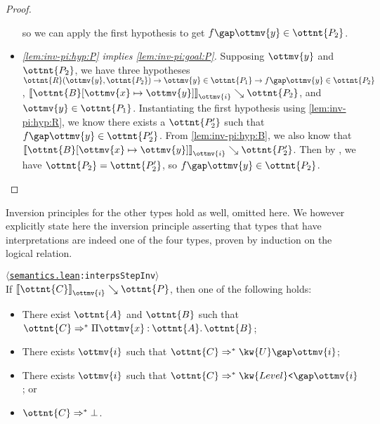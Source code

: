 \documentclass[a4paper,UKenglish,cleveref,autoref,thm-restate]{lipics-v2021}
\newcommand{\repo}{https://github.com/ionathanch/TTBFL}
\newcommand{\thmref}[2]{%
  $\langle$\href{\repo/tree/main/src/#1}{\texttt{#1}}\texttt{:#2}$\rangle$%
}
\begin{document}
\begin{proof}
\begin{itemize}[topsep=0pt]
      so we can apply the first hypothesis to get $  f  \gap  \ottmv{y}   \in  \ottnt{P_{{\mathrm{2}}}} $.
    \item \textit{\ref{lem:inv-pi:hyp:P} implies \ref{lem:inv-pi:goal:P}.}
      Supposing $\ottmv{y}$ and $\ottnt{P_{{\mathrm{2}}}}$,
      we have three hypotheses $  \ottnt{R} ( \ottmv{y} ,  \ottnt{P_{{\mathrm{2}}}} )   \to    \ottmv{y}  \in  \ottnt{P_{{\mathrm{1}}}}   \to    f  \gap  \ottmv{y}   \in  \ottnt{P_{{\mathrm{2}}}}   $,
      $ \mathopen{\llbracket}   \ottnt{B} [  \ottmv{x}  \mapsto  \ottmv{y}  ]   \mathclose{\rrbracket}_{ \ottmv{i} } \searrow  \ottnt{P_{{\mathrm{2}}}} $, and $ \ottmv{y}  \in  \ottnt{P_{{\mathrm{1}}}} $.
      Instantiating the first hypothesis using \ref{lem:inv-pi:hyp:R},
      we know there exists a $\ottnt{P'_{{\mathrm{2}}}}$ such that $  f  \gap  \ottmv{y}   \in  \ottnt{P'_{{\mathrm{2}}}} $.
      From \ref{lem:inv-pi:hyp:B}, we also know that $ \mathopen{\llbracket}   \ottnt{B} [  \ottmv{x}  \mapsto  \ottmv{y}  ]   \mathclose{\rrbracket}_{ \ottmv{i} } \searrow  \ottnt{P'_{{\mathrm{2}}}} $.
      Then by , we have $\ottnt{P_{{\mathrm{2}}}} = \ottnt{P'_{{\mathrm{2}}}}$, so $  f  \gap  \ottmv{y}   \in  \ottnt{P_{{\mathrm{2}}}} $.
      \qedhere
  \end{itemize}
\end{proof}

Inversion principles for the other types hold as well, omitted here.
We however explicitly state here the inversion principle
asserting that types that have interpretations are indeed one of the four types,
proven by induction on the logical relation.

\begin{lemma}[Inversion (l.r.)] \thmref{semantics.lean}{interpsStepInv} \label{lem:lr:inv} \\
  If $ \mathopen{\llbracket}  \ottnt{C}  \mathclose{\rrbracket}_{ \ottmv{i} } \searrow  \ottnt{P} $, then one of the following holds:
  \begin{itemize}[topsep=0pt]
    \item There exist $\ottnt{A}$ and $\ottnt{B}$ such that $ \ottnt{C}  \Rightarrow^\ast   \Pi  \ottmv{x}  \mathbin{:}  \ottnt{A}  \mathpunct{.}  \ottnt{B}  $;
    \item There exists $\ottmv{i}$ such that $ \ottnt{C}  \Rightarrow^\ast   \kw{U} \gap   \ottmv{i}   $;
    \item There exists $\ottmv{i}$ such that $ \ottnt{C}  \Rightarrow^\ast   \kw{Level}\texttt{<} \gap   \ottmv{i}   $; or
    \item $ \ottnt{C}  \Rightarrow^\ast   \bot  $.
  \end{itemize}
\end{lemma}
\end{document}
